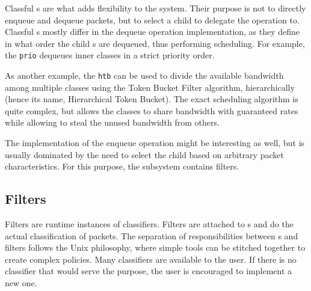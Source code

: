 Classful \qdisc{}s are what adds flexibility to the system. Their purpose is not
to directly enqueue and dequeue packets, but to select a child \qdisc{} to
delegate the operation to. Classful \qdisc{}s mostly differ in the dequeue
operation implementation, as they define in what order the child \qdisc{}s are
dequeued, thus performing scheduling. For example, the \texttt{prio} \qdisc{}
dequeues inner classes in a strict priority order.

As another example, the \texttt{htb} \qdisc{} can be used to divide the available
bandwidth among multiple classes using the Token Bucket Filter algorithm,
hierarchically (hence its name, Hierarchical Token Bucket). The exact scheduling
algorithm is quite complex, but allows the classes to share bandwidth with
guaranteed rates while allowing to steal the unused bandwidth from others.

The implementation of the enqueue operation might be interesting as well, but
is usually dominated by the need to select the child \qdisc{} based on
arbitrary packet characteristics. For this purpose, the  subsystem
contains filters.

\subsection{Filters}

Filters are runtime instances of classifiers. Filters are attached to \qdisc{}s
and do the actual classification of packets. The separation of responsibilities between
\qdisc{}s and filters follows the Unix philosophy, where simple tools can
be stitched together to create complex policies. Many classifiers are
available to the user. If there is no classifier that would serve
the purpose, the user is encouraged to implement a new one.

